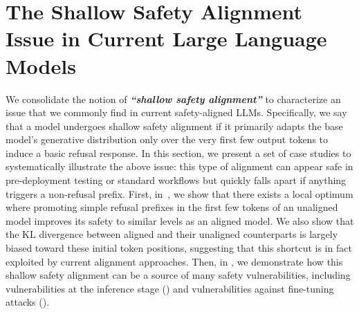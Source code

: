 

\section{The Shallow Safety Alignment Issue in Current Large Language Models}
\label{sec:shallow_alignment}






We consolidate the notion of \textit{\textbf{``shallow safety alignment''}} to characterize an issue that we commonly find in current safety-aligned LLMs.
Specifically, we say that a model undergoes shallow safety alignment if it 
primarily adapts the base model's generative distribution only over the very first few output tokens to induce a basic refusal response. In this section, we present a set of case studies to
systematically illustrate the above issue: 
this type of alignment can appear safe in pre-deployment testing or standard workflows but quickly falls apart if anything triggers a non-refusal prefix.
First, in~, we show that there exists a local optimum where promoting simple refusal prefixes in the first few tokens of an unaligned model improves its safety to similar levels as an aligned model. 
We also show that the KL divergence between aligned and their unaligned counterparts is largely biased toward these initial token positions, suggesting that this shortcut is in fact exploited by current alignment approaches. 
Then, in , we demonstrate how this shallow safety alignment can be a source of many safety vulnerabilities, including vulnerabilities at the inference stage () and vulnerabilities against fine-tuning attacks ().

